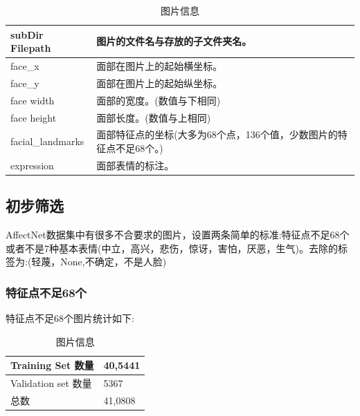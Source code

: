 \documentclass[11pt, a4paper]{article}
\begin{document}
\begin{table}[htbp] 
	\begin{center}
		\caption{图片信息}
		\begin{tabular}{|l|p{200pt}|} \hline
		subDir Filepath & 图片的文件名与存放的子文件夹名。      \\ \hline
		face\_x & 面部在图片上的起始横坐标。 \\ \hline
		face\_y & 面部在图片上的起始纵坐标。 \\ \hline
		face width & 面部的宽度。(数值与下相同) \\ \hline
		face height & 面部长度。(数值与上相同) \\ \hline
		facial\_landmarks & 面部特征点的坐标(大多为68个点，136个值，少数图片的特征点不足68个。) \\ \hline
		expression &  面部表情的标注。            \\ \hline
		\end{tabular}
		
		\label{tab:kf_meaning}
	\end{center}
\end{table}

\subsection{初步筛选}

AffectNet数据集中有很多不合要求的图片，设置两条简单的标准:特征点不足68个或者不是7种基本表情(中立，高兴，悲伤，惊讶，害怕，厌恶，生气)。去除的标签为:(轻蔑，None,不确定，不是人脸)

\subsubsection{特征点不足68个}

特征点不足68个图片统计如下:

\begin{table}[htbp] 
	\begin{center}
		\caption{图片信息}
		\begin{tabular}{|l|p{200pt}|} \hline
			Training Set 数量 & 40,5441 \\ \hline
			Validation set 数量 & 5367 \\ \hline
			总数  & 41,0808  \\ \hline
		\end{tabular}
		
		\label{tab:kf_1}
	\end{center}
\end{table}
\end{document}
